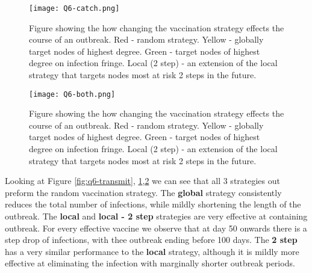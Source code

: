 \begin{figure}[h!]
    \begin{center}
        \texttt{[image: Q6-catch.png]}
        \caption{Figure showing the how changing the vaccination strategy effects the course of an outbreak. Red - random strategy. Yellow - globally target nodes of highest degree. Green - target nodes of highest degree on infection fringe. Local (2 step) - an extension of the local strategy that targets nodes most at risk 2 steps in the future.} 
        \label{fig:q6-catch}
    \end{center}
\end{figure}


\begin{figure}[h!]
    \begin{center}
        \texttt{[image: Q6-both.png]}
        \caption{Figure showing the how changing the vaccination strategy effects the course of an outbreak. Red - random strategy. Yellow - globally target nodes of highest degree. Green - target nodes of highest degree on infection fringe. Local (2 step) - an extension of the local strategy that targets nodes most at risk 2 steps in the future.} 
        \label{fig:q6-both}
    \end{center}
\end{figure}


Looking at Figure \ref{fig:q6-transmit}, \ref{fig:q6-catch},\ref{fig:q6-both} we can see that all 3 strategies out preform the random vaccination strategy.
The \textbf{global} strategy consistently reduces the total number of infections, while mildly shortening the length of the outbreak.
The \textbf{local} and \textbf{local - 2 step} strategies are very effective at containing outbreak.
For every effective vaccine we observe that at day 50 onwards there is a step drop of infections, with thee outbreak ending before 100 days.
The \textbf{2 step} has a very similar performance to the \textbf{local} strategy, although it is mildly more effective at eliminating the infection with marginally shorter outbreak periods.   